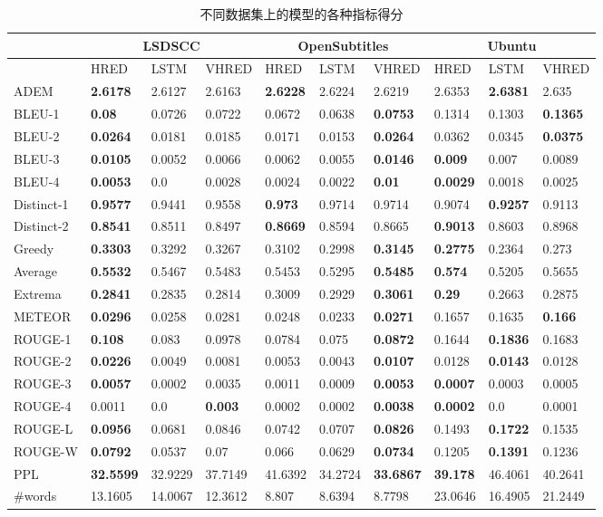 \begin{table}[H]%
\centering%
\caption{不同数据集上的模型的各种指标得分}%
\label{tab:systemScoresAll}%
\setlength{\tabcolsep}{0.11cm}%
\begin{tabular}{@{}llllllllll@{}}%
\toprule%
\midrule%
&\multicolumn{3}{c}{LSDSCC}&\multicolumn{3}{c}{OpenSubtitles}&\multicolumn{3}{c}{Ubuntu}\\%
\midrule%
&HRED&LSTM&VHRED&HRED&LSTM&VHRED&HRED&LSTM&VHRED\\%
\midrule%
ADEM&\textbf{2.6178}&2.6127&2.6163&\textbf{2.6228}&2.6224&2.6219&2.6353&\textbf{2.6381}&2.635\\%
BLEU{-}1&\textbf{0.08}&0.0726&0.0722&0.0672&0.0638&\textbf{0.0753}&0.1314&0.1303&\textbf{0.1365}\\%
BLEU{-}2&\textbf{0.0264}&0.0181&0.0185&0.0171&0.0153&\textbf{0.0264}&0.0362&0.0345&\textbf{0.0375}\\%
BLEU{-}3&\textbf{0.0105}&0.0052&0.0066&0.0062&0.0055&\textbf{0.0146}&\textbf{0.009}&0.007&0.0089\\%
BLEU{-}4&\textbf{0.0053}&0.0&0.0028&0.0024&0.0022&\textbf{0.01}&\textbf{0.0029}&0.0018&0.0025\\%
Distinct{-}1&\textbf{0.9577}&0.9441&0.9558&\textbf{0.973}&0.9714&0.9714&0.9074&\textbf{0.9257}&0.9113\\%
Distinct{-}2&\textbf{0.8541}&0.8511&0.8497&\textbf{0.8669}&0.8594&0.8665&\textbf{0.9013}&0.8603&0.8968\\%
Greedy&\textbf{0.3303}&0.3292&0.3267&0.3102&0.2998&\textbf{0.3145}&\textbf{0.2775}&0.2364&0.273\\%
Average&\textbf{0.5532}&0.5467&0.5483&0.5453&0.5295&\textbf{0.5485}&\textbf{0.574}&0.5205&0.5655\\%
Extrema&\textbf{0.2841}&0.2835&0.2814&0.3009&0.2929&\textbf{0.3061}&\textbf{0.29}&0.2663&0.2875\\%
METEOR&\textbf{0.0296}&0.0258&0.0281&0.0248&0.0233&\textbf{0.0271}&0.1657&0.1635&\textbf{0.166}\\%
ROUGE{-}1&\textbf{0.108}&0.083&0.0978&0.0784&0.075&\textbf{0.0872}&0.1644&\textbf{0.1836}&0.1683\\%
ROUGE{-}2&\textbf{0.0226}&0.0049&0.0081&0.0053&0.0043&\textbf{0.0107}&0.0128&\textbf{0.0143}&0.0128\\%
ROUGE{-}3&\textbf{0.0057}&0.0002&0.0035&0.0011&0.0009&\textbf{0.0053}&\textbf{0.0007}&0.0003&0.0005\\%
ROUGE{-}4&0.0011&0.0&\textbf{0.003}&0.0002&0.0002&\textbf{0.0038}&\textbf{0.0002}&0.0&0.0001\\%
ROUGE{-}L&\textbf{0.0956}&0.0681&0.0846&0.0742&0.0707&\textbf{0.0826}&0.1493&\textbf{0.1722}&0.1535\\%
ROUGE{-}W&\textbf{0.0792}&0.0537&0.07&0.066&0.0629&\textbf{0.0734}&0.1205&\textbf{0.1391}&0.1236\\%
PPL&\textbf{32.5599}&32.9229&37.7149&41.6392&34.2724&\textbf{33.6867}&\textbf{39.178}&46.4061&40.2641\\%
\#words&13.1605&14.0067&12.3612&8.807&8.6394&8.7798&23.0646&16.4905&21.2449\\\bottomrule%
%
\end{tabular}%
\end{table}